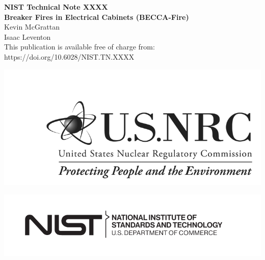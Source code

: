 \documentclass[12pt]{article}
\newcommand{\pubnumber}{XXXX}
\newcommand{\DOI}{https://doi.org/10.6028/NIST.TN.XXXX}
\begin{document}
	
	\begin{titlepage}
		\begin{flushright}
\LARGE{\textbf{NIST Technical Note \pubnumber}}\\
\vfill
\Huge{\textbf{Breaker Fires in Electrical Cabinets (BECCA-Fire)}}\\
\vfill
\large Kevin McGrattan \\ Isaac Leventon \\
\vfill
\normalsize This publication is available free of charge from:\\
\DOI\\
\vfill

\includegraphics[width=0.5\linewidth]{../FIGURES/NRC_logo} %

\vspace{0.5in}

\includegraphics[width=0.3\linewidth]{../FIGURES/NIST-logo}\\


\end{flushright}
\end{titlepage}
\end{document}
